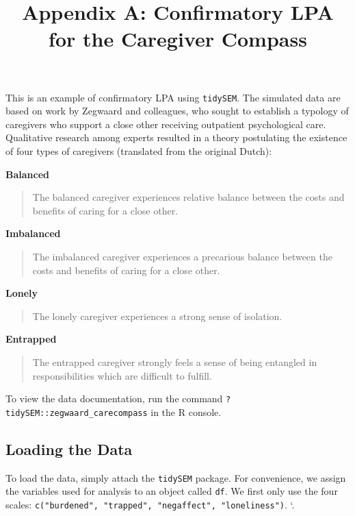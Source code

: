 \documentclass[
  man,floatsintext]{apa6}
\title{Appendix A: Confirmatory LPA for the Caregiver Compass}
\author{\phantom{0}}
\date{}
\affiliation{\phantom{0}}
\begin{document}
\maketitle

This is an example of confirmatory LPA using \texttt{tidySEM}.
The simulated data are based on work by Zegwaard and colleagues, who sought to establish a typology of caregivers who support a close other receiving outpatient psychological care.
Qualitative research among experts resulted in a theory postulating the existence of four types of caregivers (translated from the original Dutch):

\textbf{Balanced}

\begin{quote}
The balanced caregiver experiences relative balance between the costs and benefits of caring for a close other.
\end{quote}

\textbf{Imbalanced}

\begin{quote}
The imbalanced caregiver experiences a precarious balance between the costs and benefits of caring for a close other.
\end{quote}

\textbf{Lonely}

\begin{quote}
The lonely caregiver experiences a strong sense of isolation.
\end{quote}

\textbf{Entrapped}

\begin{quote}
The entrapped caregiver strongly feels a sense of being entangled in responsibilities which are difficult to fulfill.
\end{quote}

To view the data documentation, run the command \texttt{?tidySEM::zegwaard\_carecompass} in the R console.

\hypertarget{loading-the-data}{%
\subsection{Loading the Data}\label{loading-the-data}}

To load the data, simply attach the \texttt{tidySEM} package.
For convenience, we assign the variables used for analysis to an object called \texttt{df}.
We first only use the four scales: \texttt{c("burdened",\ "trapped",\ "negaffect",\ "loneliness")}.
`.
\end{document}
